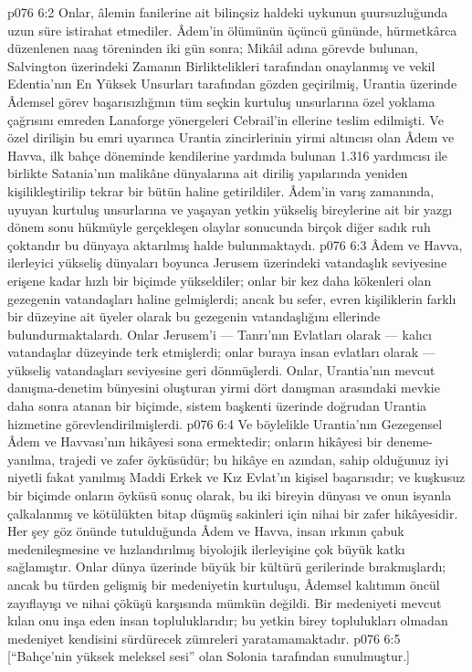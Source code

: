 \vs p076 6:2 Onlar, âlemin fanilerine ait bilinçsiz haldeki uykunun şuursuzluğunda uzun süre istirahat etmediler. Âdem’in ölümünün üçüncü gününde, hürmetkârca düzenlenen naaş töreninden iki gün sonra; Mikâil adına görevde bulunan, Salvington üzerindeki Zamanın Birliktelikleri tarafından onaylanmış ve vekil Edentia’nın En Yüksek Unsurları tarafından gözden geçirilmiş, Urantia üzerinde Âdemsel görev başarısızlığının tüm seçkin kurtuluş unsurlarına özel yoklama çağrısını emreden Lanaforge yönergeleri Cebrail’in ellerine teslim edilmişti. Ve özel dirilişin bu emri uyarınca Urantia zincirlerinin yirmi altıncısı olan Âdem ve Havva, ilk bahçe döneminde kendilerine yardımda bulunan 1.316 yardımcısı ile birlikte Satania’nın malikâne dünyalarına ait diriliş yapılarında yeniden kişilikleştirilip tekrar bir bütün haline getirildiler. Âdem’in varış zamanında, uyuyan kurtuluş unsurlarına ve yaşayan yetkin yükseliş bireylerine ait bir yazgı dönem sonu hükmüyle gerçekleşen olaylar sonucunda birçok diğer sadık ruh çoktandır bu dünyaya aktarılmış halde bulunmaktaydı.
\vs p076 6:3 Âdem ve Havva, ilerleyici yükseliş dünyaları boyunca Jerusem üzerindeki vatandaşlık seviyesine erişene kadar hızlı bir biçimde yükseldiler; onlar bir kez daha kökenleri olan gezegenin vatandaşları haline gelmişlerdi; ancak bu sefer, evren kişiliklerin farklı bir düzeyine ait üyeler olarak bu gezegenin vatandaşlığını ellerinde bulundurmaktalardı. Onlar Jerusem’i --- Tanrı’nın Evlatları olarak --- kalıcı vatandaşlar düzeyinde terk etmişlerdi; onlar buraya insan evlatları olarak --- yükseliş vatandaşları seviyesine geri dönmüşlerdi. Onlar, Urantia’nın mevcut danışma\hyp{}denetim bünyesini oluşturan yirmi dört danışman arasındaki mevkie daha sonra atanan bir biçimde, sistem başkenti üzerinde doğrudan Urantia hizmetine görevlendirilmişlerdi.
\vs p076 6:4 Ve böylelikle Urantia’nın Gezegensel Âdem ve Havvası’nın hikâyesi sona ermektedir; onların hikâyesi bir deneme\hyp{}yanılma, trajedi ve zafer öyküsüdür; bu hikâye en azından, sahip olduğunuz iyi niyetli fakat yanılmış Maddi Erkek ve Kız Evlat’ın kişisel başarısıdır; ve kuşkusuz bir biçimde onların öyküsü sonuç olarak, bu iki bireyin dünyası ve onun isyanla çalkalanmış ve kötülükten bitap düşmüş sakinleri için nihai bir zafer hikâyesidir. Her şey göz önünde tutulduğunda Âdem ve Havva, insan ırkının çabuk medenileşmesine ve hızlandırılmış biyolojik ilerleyişine çok büyük katkı sağlamıştır. Onlar dünya üzerinde büyük bir kültürü gerilerinde bırakmışlardı; ancak bu türden gelişmiş bir medeniyetin kurtuluşu, Âdemsel kalıtımın öncül zayıflayışı ve nihai çöküşü karşısında mümkün değildi. Bir medeniyeti mevcut kılan onu inşa eden insan topluluklarıdır; bu yetkin birey toplulukları olmadan medeniyet kendisini sürdürecek zümreleri yaratamamaktadır.
\vs p076 6:5 [“Bahçe’nin {yüksek} meleksel sesi” olan Solonia tarafından sunulmuştur.]

